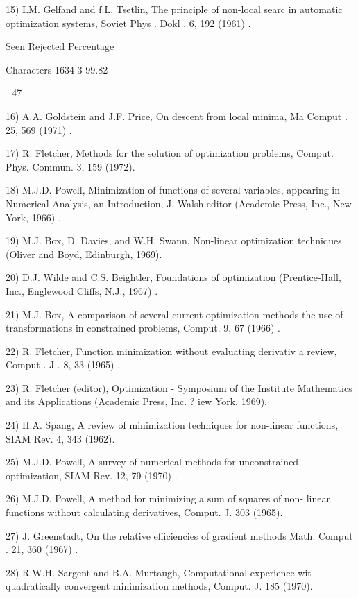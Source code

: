 15)  I.M. Gelfand and f.L. Tsetlin, The principle of non-local searc
        in automatic optimization systems, Soviet Phys . Dokl . 6, 192
        (1961) .
 
                 Seen Rejected  Percentage
 
Characters       1634        3   99.82
 
                              - 47 -
 
 
16) A.A. Goldstein and J.F. Price, On descent from local minima, Ma
        Comput . 25, 569 (1971) .
 
17) R. Fletcher, Methods for the solution of optimization problems,
        Comput. Phys. Commun. 3, 159 (1972).
 
18)  M.J.D. Powell, Minimization of functions of several variables,
        appearing in Numerical Analysis, an Introduction, J. Walsh
        editor (Academic Press, Inc., New York, 1966) .
 
19)  M.J. Box, D. Davies, and W.H. Swann, Non-linear optimization
        techniques (Oliver and Boyd, Edinburgh, 1969).
 
20) D.J. Wilde and C.S. Beightler, Foundations of optimization
        (Prentice-Hall, Inc., Englewood Cliffs, N.J., 1967) .
 
21) M.J. Box, A comparison of several current optimization methods
        the use of transformations in constrained problems, Comput.
        9, 67 (1966) .
 
22) R. Fletcher, Function minimization without evaluating derivativ
        a review, Comput . J . 8, 33 (1965) .
 
23) R. Fletcher (editor), Optimization - Symposium of the Institute
        Mathematics and its Applications  (Academic Press, Inc. ?
        iew York, 1969).
 
24) H.A. Spang, A review of minimization techniques for non-linear
        functions, SIAM Rev. 4, 343 (1962).
 
25) M.J.D. Powell, A survey of numerical methods for unconstrained
        optimization, SIAM Rev. 12, 79 (1970) .
 
26) M.J.D. Powell, A method for minimizing a sum of squares of non-
        linear functions without calculating derivatives, Comput. J.
        303 (1965).
 
27) J. Greenstadt, On the relative efficiencies of gradient methods
        Math. Comput . 21, 360 (1967) .
 
28) R.W.H. Sargent and B.A. Murtaugh, Computational experience wit
        quadratically convergent minimization methods, Comput. J.
        185 (1970).
 
